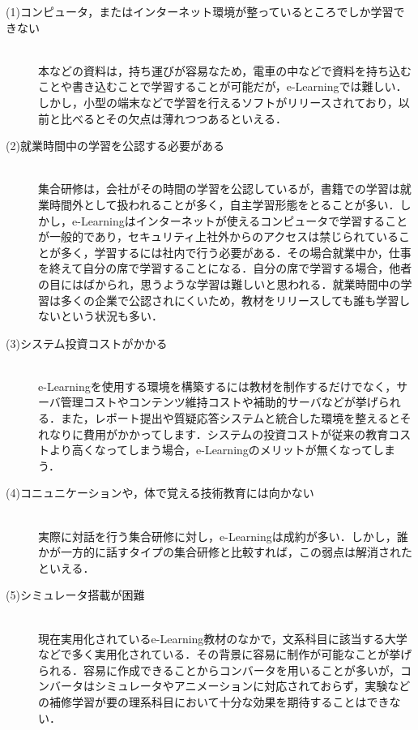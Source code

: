 \documentclass[a4j,12pt]{jsarticle}
\begin{document}
\begin{description} 

\item[(1)コンピュータ，またはインターネット環境が整っているところでしか学習できない]\mbox{}\\ 
本などの資料は，持ち運びが容易なため，電車の中などで資料を持ち込むことや書き込むことで学習することが可能だが，e-Learningでは難しい．しかし，小型の端末などで学習を行えるソフトがリリースされており，以前と比べるとその欠点は薄れつつあるといえる．

\item[(2)就業時間中の学習を公認する必要がある]\mbox{}\\ 
集合研修は，会社がその時間の学習を公認しているが，書籍での学習は就業時間外として扱われることが多く，自主学習形態をとることが多い．しかし，e-Learningはインターネットが使えるコンピュータで学習することが一般的であり，セキュリティ上社外からのアクセスは禁じられていることが多く，学習するには社内で行う必要がある．その場合就業中か，仕事を終えて自分の席で学習することになる．自分の席で学習する場合，他者の目にはばかられ，思うような学習は難しいと思われる．就業時間中の学習は多くの企業で公認されにくいため，教材をリリースしても誰も学習しないという状況も多い．

\item[(3)システム投資コストがかかる]\mbox{}\\ 
e-Learningを使用する環境を構築するには教材を制作するだけでなく，サーバ管理コストやコンテンツ維持コストや補助的サーバなどが挙げられる．また，レポート提出や質疑応答システムと統合した環境を整えるとそれなりに費用がかかってします．システムの投資コストが従来の教育コストより高くなってしまう場合，e-Learningのメリットが無くなってしまう．

\item[(4)コニュニケーションや，体で覚える技術教育には向かない]\mbox{}\\
実際に対話を行う集合研修に対し，e-Learningは成約が多い．しかし，誰かが一方的に話すタイプの集合研修と比較すれば，この弱点は解消されたといえる．

\item[(5)シミュレータ搭載が困難]\mbox{}\\
 現在実用化されているe-Learning教材のなかで，文系科目に該当する大学などで多く実用化されている．その背景に容易に制作が可能なことが挙げられる．容易に作成できることからコンバータを用いることが多いが，コンバータはシミュレータやアニメーションに対応されておらず，実験などの補修学習が要の理系科目において十分な効果を期待することはできない．
\end{description}
\newpage
\end{document}
